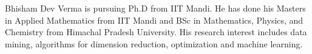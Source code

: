 \documentclass[10pt,journal,compsoc]{IEEEtran}
\begin{document}
 \begin{IEEEbiography}{Bhisham Dev Verma}
 is pursuing Ph.D from IIT Mandi. He has done his Masters in Applied Mathematics from IIT Mandi and BSc in Mathematics, Physics, and Chemistry from Himachal Pradesh University. His research interest includes data mining, algorithms for dimension reduction, optimization and machine learning.
 \end{IEEEbiography}


\newpage
\clearpage
\appendices







\end{document}
